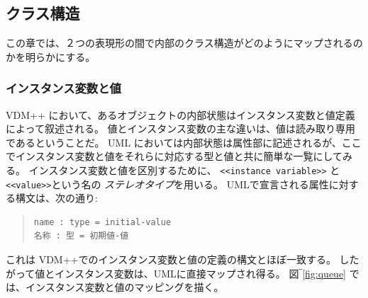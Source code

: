 \documentclass[\pformat,12pt]{jarticle}
\newcommand{\vdmpp}{VDM++}
\begin{document}
\subsection{クラス構造} \label{classstructure}
  
この章では、２つの表現形の間で内部のクラス構造がどのようにマップされるのかを明らかにする。

\subsubsection*{インスタンス変数と値}
 
\vdmpp{} において、あるオブジェクトの内部状態はインスタンス変数と値定義によって叙述される。
値とインスタンス変数の主な違いは、値は読み取り専用であるということだ。
UML においては内部状態は属性部に記述されるが、ここでインスタンス変数と値をそれらに対応する型と値と共に簡単な一覧にしてみる。
 インスタンス変数と値を区別するために、 {\tt <<instance variable>>} と {\tt <<value>>}という名の {\it ステレオタイプ}を用いる。 
UMLで宣言される属性に対する構文は、次の通り:  

\begin{quote}
\begin{verbatim}
name : type = initial-value
名称 : 型 = 初期値-値
\end{verbatim}
\end{quote}

これは \vdmpp{}でのインスタンス変数と値の定義の構文とほぼ一致する。
したがって値とインスタンス変数は、UMLに直接マップされ得る。
図‾\ref{fig:queue} では、インスタンス変数と値のマッピングを描く。

%
\end{document}
